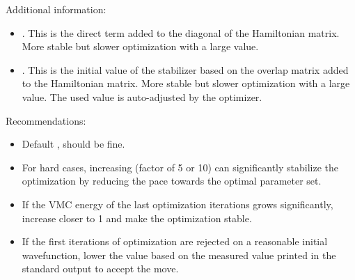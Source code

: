 Additional information:
\begin{itemize}
\item {}. This is the direct term added to the diagonal of the Hamiltonian matrix.
                         More stable but slower optimization with a large value.
\item {}. This is the initial value of the stabilizer based on the overlap matrix added to the Hamiltonian matrix.
                         More stable but slower optimization with a large value. The used value is auto-adjusted by the optimizer.
\end{itemize}


Recommendations:
\begin{itemize}
  \item Default ,  should be fine.
  \item For hard cases, increasing  (factor of 5 or 10) can significantly stabilize the optimization by reducing the pace towards the optimal parameter set.
  \item If the VMC energy of the last optimization iterations grows significantly, increase  closer to 1 and make the optimization stable.
  \item If the first iterations of optimization are rejected on a reasonable initial wavefunction, 
        lower the  value based on the measured value printed in the standard output to accept the move.
\end{itemize}


